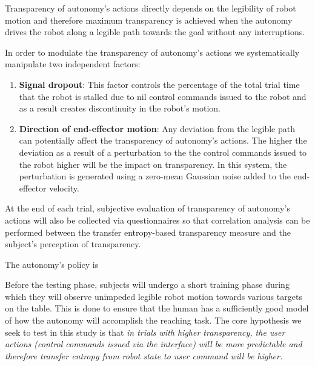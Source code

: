 \documentclass[12pt]{article}
\begin{document}
Transparency of autonomy's actions directly depends on the legibility of robot motion and therefore maximum transparency is achieved when the autonomy drives the robot along a legible path towards the goal without any interruptions. 

In order to modulate the transparency of autonomy's actions we systematically manipulate two independent factors:
\begin{enumerate}
	\item \textbf{Signal dropout}: This factor controls the percentage of the total trial time that the robot is stalled due to nil control commands issued to the robot and as a result creates discontinuity in the robot's motion. 
	\item \textbf{Direction of end-effector motion}: Any deviation from the legible path can potentially affect the transparency of autonomy's actions. The higher the deviation as a result of a perturbation to the the control commands issued to the robot higher will be the impact on transparency. In this system, the perturbation is generated using a zero-mean Gaussian noise added to the end-effector velocity. 
\end{enumerate}

At the end of each trial, subjective evaluation of transparency of autonomy's actions will also be collected via questionnaires so that correlation analysis can be performed between the transfer entropy-based transparency measure and the subject's perception of transparency. 

The autonomy's policy is 	

Before the testing phase, subjects will undergo a short training phase during which they will observe unimpeded legible robot motion towards various targets on the table. This is done to ensure that the human has a sufficiently good model of how the autonomy will accomplish the reaching task.  
The core hypothesis we seek to test in this study is that \textit{in trials with higher transparency, the user actions (control commands issued via the interface) will be more predictable and therefore transfer entropy from robot state to user command will be higher. }
\end{document}
